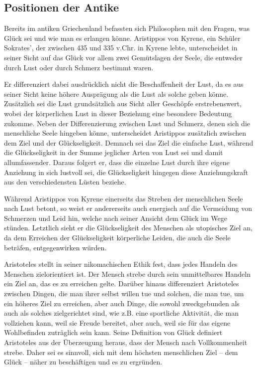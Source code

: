 \subsection{Positionen der Antike}

Bereits im antiken Griechenland befassten sich Philosophen mit den Fragen, was Glück sei und wie man es erlangen könne. 
Aristippos von Kyrene, ein Schüler Sokrates', der zwischen 435 und 335 v.Chr. in Kyrene lebte, unterscheidet in seiner Sicht auf das Glück vor allem zwei Gemütslagen der Seele, die entweder durch Lust oder durch Schmerz bestimmt waren\cite[S.\,116]{DL67}.

Er differenziert dabei ausdrücklich nicht die Beschaffenheit der Lust, da es aus seiner Sicht keine höhere Ausprägung als die Lust als solche geben könne. 
Zusätzlich sei die Lust grundsätzlich aus Sicht aller Geschöpfe erstrebenswert, wobei der körperlichen Lust in dieser Beziehung eine besondere Bedeutung zukomme. 
Neben der Differenzierung zwischen Lust und Schmerz, denen sich die menschliche Seele hingeben könne, unterscheidet Aristippos zusätzlich zwischen dem Ziel und der Glückseligkeit. 
Demnach sei das Ziel die einfache Lust, während die Glückseligkeit in der Summe jeglicher Arten von Lust sei und damit allumfassender\cite[S.\,116]{DL67}.
Daraus folgert er, dass die einzelne Lust durch ihre eigene Anziehung in sich lustvoll sei, die Glückseligkeit hingegen diese Anziehungskraft aus den verschiedensten Lüsten beziehe. 

Während Aristippos von Kyrene einerseits das Streben der menschlichen Seele nach Lust betont, so weist er andererseits auch energisch auf die Vermeidung von Schmerzen und Leid hin, welche nach seiner Ansicht dem Glück im Wege stünden. 
Letztlich sieht er die Glückseligkeit des Menschen als utopisches Ziel an, da dem Erreichen der Glückseligkeit körperliche Leiden, die auch die Seele beträfen, entgegenwirken würden\cite[S.\,119]{DL67}.

Aristoteles stellt in seiner nikomachischen Ethik fest, dass jedes Handeln des Menschen zielorientiert ist. 
Der Mensch strebe durch sein unmittelbares Handeln ein Ziel an, das es zu erreichen gelte\cite[S.\,4]{MF93}.
Darüber hinaus differenziert Aristoteles zwischen Dingen, die man ihrer selbst willen tue und solchen, die man tue, um ein höheres Ziel zu erreichen, aber auch Dinge, die sowohl zweckgebunden als auch als solches zielgerichtet sind, wie z.B. eine sportliche Aktivität, die man vollziehen kann, weil sie Freude bereitet, aber auch, weil sie für das eigene Wohlbefinden zuträglich sein kann. 
Seine Definition von Glück definiert Aristoteles aus der Überzeugung heraus, dass der Mensch nach Vollkommenheit strebe. 
Daher sei es sinnvoll, sich mit dem höchsten menschlichen Ziel -- dem Glück -- näher zu beschäftigen und es zu ergründen. 

